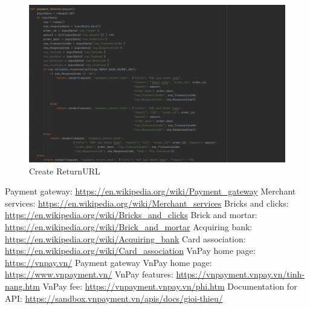 \documentclass[12pt,a4paper]{article}
\begin{document}
\begin{figure}[h!]
  	\includegraphics[width=\linewidth]{payment-re.png}
    \caption{Create ReturnURL}
  	\label{fig:rurl}
\end{figure}



\begin{thebibliography}{}
Payment gateway: \url{https://en.wikipedia.org/wiki/Payment_gateway}
Merchant services: \url{https://en.wikipedia.org/wiki/Merchant_services}
Bricks and clicks: \url{https://en.wikipedia.org/wiki/Bricks_and_clicks}
Brick and mortar: \url{https://en.wikipedia.org/wiki/Brick_and_mortar}
Acquiring bank: \url{https://en.wikipedia.org/wiki/Acquiring_bank}
Card association: \url{https://en.wikipedia.org/wiki/Card_association}
VnPay home page: \url{https://vnpay.vn/}
Payment gateway VnPay home page: \url{https://www.vnpayment.vn/}
VnPay features: \url{https://vnpayment.vnpay.vn/tinh-nang.htm}
VnPay fee: \url{https://vnpayment.vnpay.vn/phi.htm}
Documentation for API: \url{https://sandbox.vnpayment.vn/apis/docs/gioi-thieu/}
\end{thebibliography}
\end{document}
